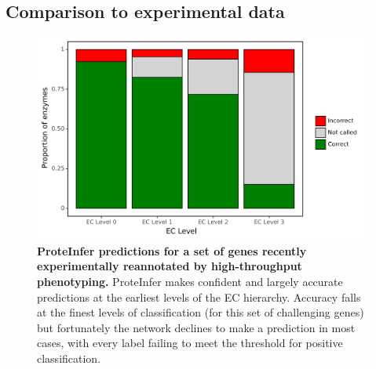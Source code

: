 \DIFaddend %
\subsection*{Comparison to experimental data}
\begin{figure}[t]
\centering
  \DIFdelbeginFL %
\DIFdelendFL \DIFaddbeginFL \includegraphics[width=\columnwidth]{price.png}\DIFaddendFL %
  \caption{\textbf{ProteInfer predictions for a set of genes recently experimentally reannotated by high-throughput phenotyping.} ProteInfer makes confident and largely accurate predictions at the earliest levels of the EC hierarchy. Accuracy falls at the finest levels of classification (for this set of challenging genes) but fortunately the network declines to make a prediction in most cases, with every label failing to meet the threshold for positive classification. \label{fig:levels}}
\end{figure}


